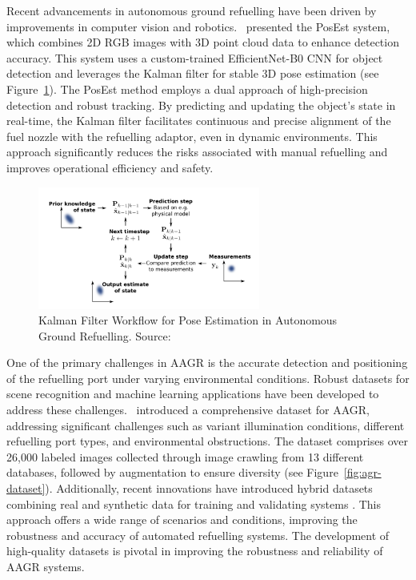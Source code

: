 \documentclass[12pt,oneside]{book} %
\begin{document}
Recent advancements in autonomous ground refuelling have been driven by
improvements in computer vision and robotics.~\citet{AGRPoseEstimation}
presented the PosEst system, which combines 2D RGB images with 3D point cloud
data to enhance detection accuracy. This system uses a custom-trained
EfficientNet-B0 CNN for object detection and leverages the Kalman filter for
stable 3D pose estimation (see Figure~\ref{fig:agr-pose-kalman}). The PosEst
method employs a dual approach of high-precision detection and robust tracking.
By predicting and updating the object’s state in real-time, the Kalman filter
facilitates continuous and precise alignment of the fuel nozzle with the
refuelling adaptor, even in dynamic environments. This approach significantly
reduces the risks associated with manual refuelling and improves operational
efficiency and safety.

\begin{figure}[H]
    \centering
    \includegraphics[width=0.65\textwidth]{figures/AGRPoseKalman.png}
    \caption{Kalman Filter Workflow for Pose Estimation in Autonomous Ground Refuelling. Source: \citet{AGRPoseEstimation}}\label{fig:agr-pose-kalman}
\end{figure}

One of the primary challenges in AAGR is the accurate detection and positioning
of the refuelling port under varying environmental conditions. Robust datasets
for scene recognition and machine learning applications have been developed to
address these challenges.~\citet{DatasetAGR} introduced a comprehensive dataset
for AAGR, addressing significant challenges such as variant illumination
conditions, different refuelling port types, and environmental obstructions.
The dataset comprises over 26,000 labeled images collected through image
crawling from 13 different databases, followed by augmentation to ensure
diversity (see Figure~\ref{fig:agr-dataset}). Additionally, recent innovations
have introduced hybrid datasets combining real and synthetic data for training
and validating systems \cite{HybridDatasetAGRV1, HybridDatasetAGRV2}. This
approach offers a wide range of scenarios and conditions, improving the
robustness and accuracy of automated refuelling systems. The development of
high-quality datasets is pivotal in improving the robustness and reliability of
AAGR systems.
\end{document}
